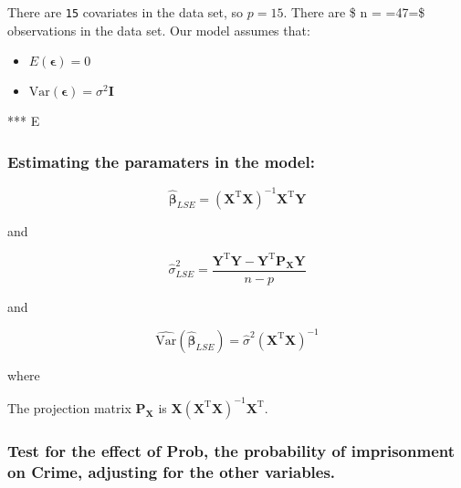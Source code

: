 \documentclass[11pt]{article}
\begin{document}
 There are \texttt{15} covariates in the
 data set, so $p = 15$. There are \$ n =
 =47=\$ observations in the data set.  
Our model assumes that:
\begin{itemize}
\item $E(\mathbf{\epsilon}) = 0$
\item $\mathrm{Var}(\mathbf{\epsilon}) = \sigma^2\mathbf{I}$
\end{itemize}
 
 *** E
\subsubsection{Estimating the paramaters in the model:}
\label{sec-1-2-2}

 $$\hat{\mathbf{\beta}}_{LSE} =
 (\mathbf{X}^{\mathrm{T}}\mathbf{X})^{-1}\mathbf{X}^{\mathrm{T}}\mathbf{Y}$$

 and

 $$\hat{\sigma}^2_{LSE} =
\frac{\mathbf{Y}^{\mathrm{T}}\mathbf{Y} -
 \mathbf{Y}^{\mathrm{T}} \mathbf{P_X}\mathbf{Y}}{n - p}$$

and

$$\hat{\mathrm{Var}}(\hat{\mathbf{\beta}}_{LSE}) =
\hat{\sigma}^2(\mathbf{X}^{\mathrm{T}}\mathbf{X})^{-1}$$

where

The projection matrix $\mathbf{P_X}$ is $\mathbf{X}(\mathbf{X}^{\mathrm{T}}\mathbf{X})^{-1}\mathbf{X}^{\mathrm{T}}$.
\subsubsection{Test for the effect of Prob, the probability of imprisonment on Crime, adjusting for the other variables.}
\label{sec-1-2-3}
\end{document}

